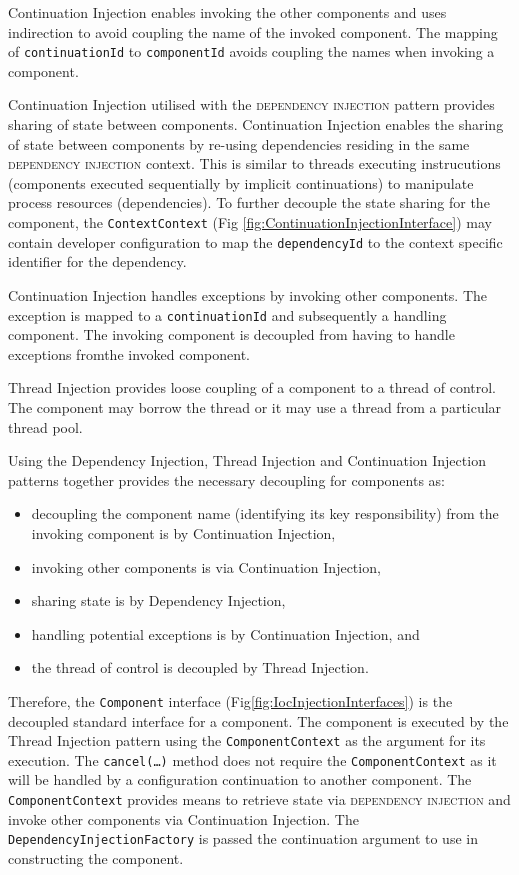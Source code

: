 \documentclass[prodmode]{style/acmlarge}
\begin{document}
Continuation Injection enables invoking the other components and uses
indirection to avoid coupling the name of the invoked component.  The mapping of
\texttt{continuationId} to \texttt{componentId} avoids coupling the names when
invoking a component.

Continuation Injection utilised with the \textsc{dependency injection} pattern
\cite{ioc} provides sharing of state between components.  Continuation Injection
enables the sharing of state between components by re-using dependencies
residing in the same \textsc{dependency injection} context.  This is similar to
threads executing instrucutions (components executed sequentially by implicit
continuations) to manipulate process resources (dependencies).  To further
decouple the state sharing for the component, the \texttt{ContextContext} (Fig
\ref{fig:ContinuationInjectionInterface}) may contain developer configuration to
map the \texttt{dependencyId} to the context specific identifier for the
dependency.

Continuation Injection handles exceptions by invoking other components. The
exception is mapped to a \texttt{continuationId} and subsequently a handling
component.  The invoking component is decoupled from having to handle exceptions
fromthe invoked component.

Thread Injection provides loose coupling of a component to a thread of control.
The component may borrow the thread or it may use a thread from a particular
thread pool.

Using the Dependency Injection, Thread Injection and Continuation Injection
patterns together provides the necessary decoupling for components as:
\begin{itemize}
  \item decoupling the component name (identifying its key responsibility) from the invoking component is by Continuation Injection,
  \item invoking other components is via Continuation Injection,
  \item sharing state is by Dependency Injection,
  \item handling potential exceptions is by Continuation Injection, and
  \item the thread of control is decoupled by Thread Injection.
\end{itemize}

Therefore, the \texttt{Component} interface
(Fig\ref{fig:IocInjectionInterfaces}) is the decoupled standard interface for a
component.  The component is executed by the Thread Injection pattern using the
\texttt{ComponentContext} as the argument for its execution.  The
\texttt{cancel(\ldots)} method does not require the \texttt{ComponentContext} as
it will be handled by a configuration continuation to another component.  The
\texttt{ComponentContext} provides means to retrieve state via
\textsc{dependency injection} and invoke other components via Continuation
Injection.  The \texttt{DependencyInjectionFactory} is passed the continuation
argument to use in constructing the component.
\end{document}
